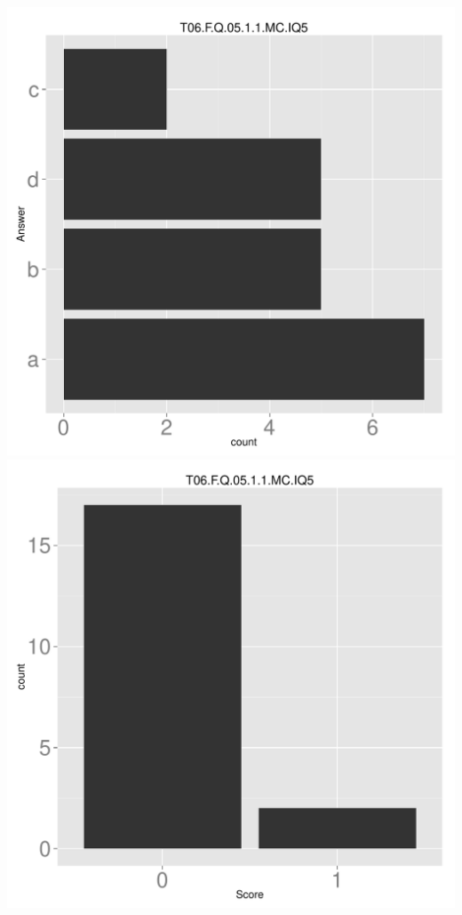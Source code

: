 \documentclass[12pt,nohyper]{tufte-handout}\usepackage[]{graphicx}\usepackage[]{color}
\begin{document}
\begin{center} \includegraphics[width=.45\linewidth]{Topic06_67_answer} \includegraphics[width=.45\linewidth]{Topic06_67_score} \end{center} 
\end{document}
